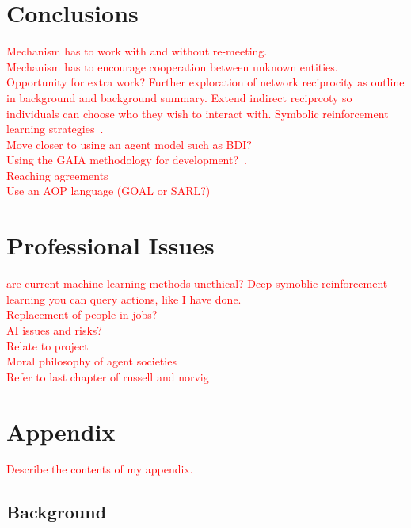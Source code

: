 \documentclass[]{final_report}
\begin{document}
\chapter{Conclusions}
\textcolor{red}{Mechanism has to work with and without re-meeting.\\
Mechanism has to encourage cooperation between unknown entities.\\
Opportunity for extra work? Further exploration of network reciprocity as outline in background and background summary. Extend indirect reciprcoty so individuals can choose who they wish to interact with. Symbolic reinforcement learning strategies~\cite{harper2017reinforcement}.\\
Move closer to using an agent model such as BDI?\\
Using the GAIA methodology for development?~\cite{wooldridge2000gaia}.\\
Reaching agreements\\
Use an AOP language (GOAL or SARL?)}


\newpage
{}

\label{endpage}

\chapter{Professional Issues}
\textcolor{red}{are current machine learning methods unethical? Deep symoblic reinforcement learning you can query actions, like I have done.\\
Replacement of people in jobs?\\
AI issues and risks?\\
Relate to project\\
Moral philosophy of agent societies\\
Refer to last chapter of russell and norvig}



\chapter{Appendix}
\label{appendix}
\textcolor{red}{Describe the contents of my appendix.}
\section{Background}
\end{document}
